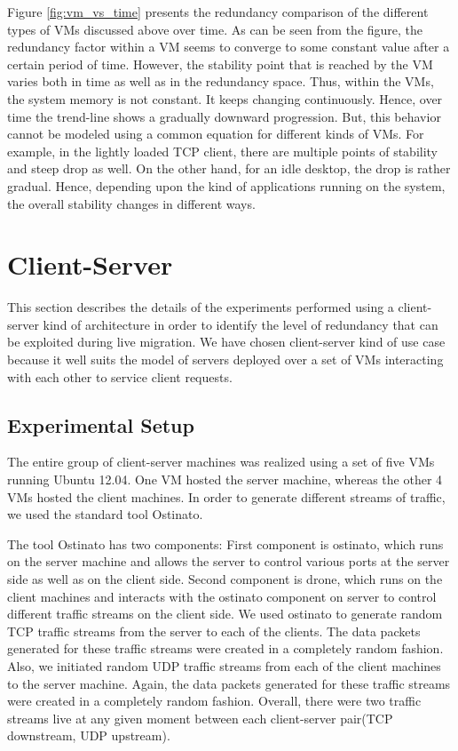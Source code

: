 \documentclass{acm_proc_article-sp}
\begin{document}
Figure \ref{fig:vm_vs_time} presents the redundancy comparison of the different types of VMs discussed above over time. As can be seen from the figure, the redundancy factor within a VM seems to converge to some constant value after a certain period of time. However, the stability point that is reached by the VM varies both in time as well as in the redundancy space. Thus, within the VMs, the system memory is not constant. It keeps changing continuously. Hence, over time the trend-line shows a gradually downward progression. But, this behavior cannot be modeled using a common equation for different kinds of VMs. For example, in the lightly loaded TCP client, there are multiple points of stability and steep drop as well. On the other hand, for an idle desktop, the drop is rather gradual. Hence, depending upon the kind of applications running on the system, the overall stability changes in different ways.

\section{Client-Server}
This section describes the details of the experiments performed using a client-server kind of architecture in order to identify the level of redundancy that can be exploited during live migration. We have chosen client-server kind of use case because it well suits the model of servers deployed over a set of VMs interacting with each other to service client requests.

\subsection{Experimental Setup}
The entire group of client-server machines was realized using a set of five VMs running Ubuntu 12.04. One VM hosted the server machine, whereas the other 4 VMs hosted the client machines. In order to generate different streams of traffic, we used the standard tool Ostinato.

The tool Ostinato has two components: First component is ostinato, which runs on the server machine and allows the server to control various ports at the server side as well as on the client side. Second component is drone, which runs on the client machines and interacts with the ostinato component on server to control different traffic streams on the client side. We used ostinato to generate random TCP traffic streams from the server to each of the clients. The data packets generated for these traffic streams were created in a completely random fashion. Also, we initiated random UDP traffic streams from each of the client machines to the server machine. Again, the data packets generated for these traffic streams were created in a completely random fashion. Overall, there were two traffic streams live at any given moment between each client-server pair(TCP downstream, UDP upstream).
\end{document}
